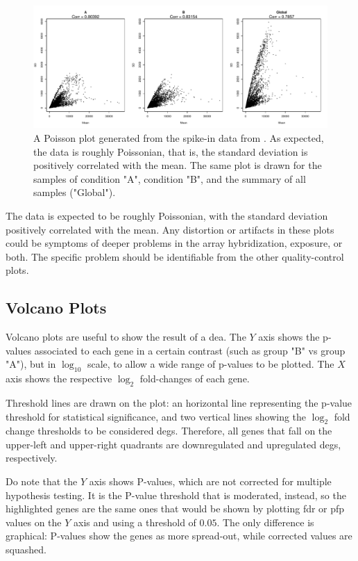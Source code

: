 \begin{figure}
    \centering
    \includegraphics{resources/images/12_SD_vs_Mean Plot.pdf}
    \caption{A Poisson plot generated from the spike-in data from \textcite{zhuPreferredAnalysisMethods2010}. As expected, the data is roughly Poissonian, that is, the standard deviation is positively correlated with the mean. The same plot is drawn for the samples of condition "A", condition "B", and the summary of all samples ("Global").}
    \label{fig:poissonplot}
\end{figure}

The data is expected to be roughly Poissonian, with the standard deviation positively correlated with the mean. Any distortion or artifacts in these plots could be symptoms of deeper problems in the array hybridization, exposure, or both. The specific problem should be identifiable from the other quality-control plots.

\subsection{Volcano Plots}
Volcano plots are useful to show the result of a \gls{dea}. The $Y$ axis shows the p-values associated to each gene in a certain contrast (such as group "B" vs group "A"), but in $\log_{10}$ scale, to allow a wide range of p-values to be plotted. The $X$ axis shows the respective $\log_2$ fold-changes of each gene.

Threshold lines are drawn on the plot: an horizontal line representing the p-value threshold for statistical significance, and two vertical lines showing the $\log_2$ fold change thresholds to be considered \glspl{deg}. Therefore, all genes that fall on the upper-left and upper-right quadrants are downregulated and upregulated \glspl{deg}, respectively.

Do note that the $Y$ axis shows P-values, which are not corrected for multiple hypothesis testing. It is the P-value threshold that is moderated, instead, so the highlighted genes are the same ones that would be shown by plotting \gls{fdr} or \gls{pfp} values on the $Y$ axis and using a threshold of $0.05$. The only difference is graphical: P-values show the genes as more spread-out, while corrected values are squashed.

